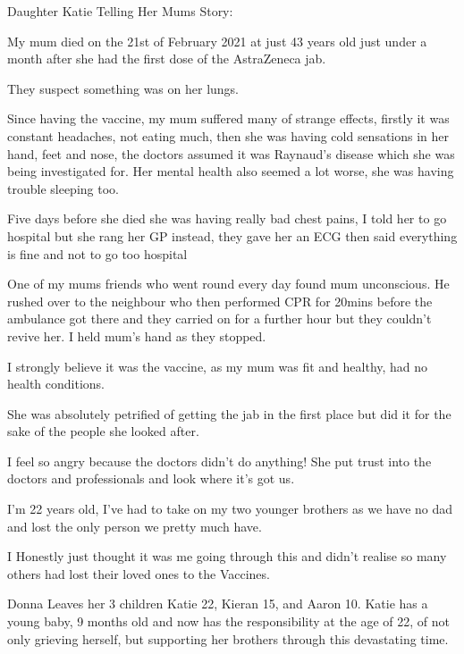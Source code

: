 Daughter Katie Telling Her Mums Story:

My mum died on the 21st of February 2021 at just 43 years old just under a month
after she had the first dose of the AstraZeneca jab.

They suspect something was on her lungs.

Since having the vaccine, my mum suffered many of strange effects, firstly it
was constant headaches, not eating much, then she was having cold sensations in
her hand, feet and nose, the doctors assumed it was Raynaud’s disease which she
was being investigated for. Her mental health also seemed a lot worse, she was
having trouble sleeping too.

Five days before she died she was having really bad chest pains, I told her to
go hospital but she rang her GP instead, they gave her an ECG then said
everything is fine and not to go too hospital

One of my mums friends who went round every day found mum unconscious. He rushed
over to the neighbour who then performed CPR for 20mins before the ambulance got
there and they carried on for a further hour but they couldn’t revive her. I
held mum’s hand as they stopped.

I strongly believe it was the vaccine, as my mum was fit and healthy, had no
health conditions.

She was absolutely petrified of getting the jab in the first place but did it
for the sake of the people she looked after.

I feel so angry because the doctors didn’t do anything! She put trust into the
doctors and professionals and look where it’s got us.

I’m 22 years old, I’ve had to take on my two younger brothers as we have no dad
and lost the only person we pretty much have.

I Honestly just thought it was me going through this and didn’t realise so many
others had lost their loved ones to the Vaccines.

Donna Leaves her 3 children Katie 22, Kieran 15, and Aaron 10. Katie has a young
baby, 9 months old and now has the responsibility at the age of 22, of not only
grieving herself, but supporting her brothers through this devastating time.
